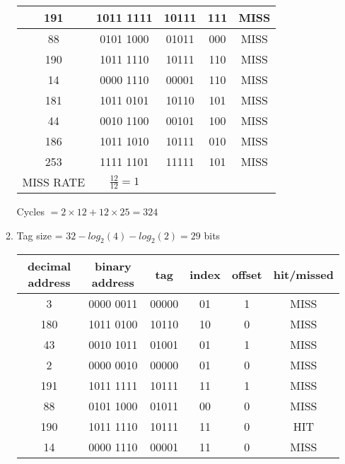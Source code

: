 \documentclass{article}
\def\math#1{$#1$}
\begin{document}
\begin{enumerate}[1)]
\begin{enumerate}[\text{C}1)]
\begin{center}
\begin{tabular}{ |c|c|c|c|c| }
                 \hline
                 191 & 1011 1111 & 10111 & 111 & MISS\\
                 \hline
                 88 & 0101 1000 & 01011 & 000 & MISS \\
                 \hline
                 190 & 1011 1110 & 10111 & 110 & MISS \\
                 \hline
                 14 & 0000 1110 & 00001 & 110 & MISS \\
                 \hline
                 181 & 1011 0101 & 10110 & 101 & MISS \\
                 \hline
                 44 & 0010 1100 & 00101 & 100 & MISS \\
                 \hline
                 186 & 1011 1010 & 10111 & 010 & MISS \\
                 \hline
                 253 & 1111 1101 & 11111 & 101 & MISS \\
                 \hline
                 MISS RATE & \math{\frac{12}{12} = 1} \\ 
                \end{tabular}
        \end{center}
        Cycles \math{ = 2 \times 12 + 12 \times 25 = 324}
        \item Tag size = \math{32 - log_2(4) - log_2(2) = 29} bits
        \begin{center}
            \begin{tabular}{ |c|c|c|c|c|c| }
             \hline
             decimal address & binary address & tag & index & offset & hit/missed \\
             \hline
             3 & 0000 0011 & 00000 & 01 & 1 & MISS \\  
             \hline
             180 & 1011 0100 & 10110 & 10 & 0 & MISS \\
             \hline
             43 & 0010 1011 & 01001 & 01 & 1 & MISS \\
             \hline
             2 & 0000 0010 & 00000 & 01 & 0 & MISS \\
             \hline
             191 & 1011 1111 & 10111 & 11 & 1 & MISS\\
             \hline
             88 & 0101 1000 & 01011 & 00 & 0 & MISS \\
             \hline
             190 & 1011 1110 & 10111 & 11 & 0 & HIT \\
             \hline
             14 & 0000 1110 & 00001 & 11 & 0 & MISS \\
             \hline

\end{tabular}
\end{center}
\end{enumerate}
\end{enumerate}
\end{document}
